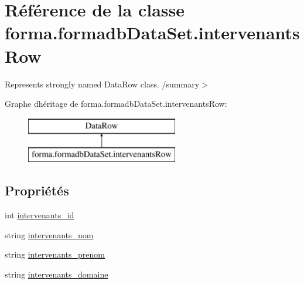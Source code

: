 \hypertarget{classforma_1_1formadb_data_set_1_1intervenants_row}{}\section{Référence de la classe forma.\+formadb\+Data\+Set.\+intervenants\+Row}
\label{classforma_1_1formadb_data_set_1_1intervenants_row}


Represents strongly named Data\+Row class. /summary$>$  


Graphe d\textquotesingle{}héritage de forma.\+formadb\+Data\+Set.\+intervenants\+Row\+:\begin{figure}[H]
\begin{center}
\leavevmode
\includegraphics[height=2.000000cm]{classforma_1_1formadb_data_set_1_1intervenants_row}
\end{center}
\end{figure}
\subsection*{Propriétés}
\begin{DoxyCompactItemize}
\item 
int \hyperlink{classforma_1_1formadb_data_set_1_1intervenants_row_a9b6da0325439fe5786829f657a0c586a}{intervenants\+\_\+id}
\item 
string \hyperlink{classforma_1_1formadb_data_set_1_1intervenants_row_a59554056d0eabe48f9cce7f8ea32a7de}{intervenants\+\_\+nom}
\item 
string \hyperlink{classforma_1_1formadb_data_set_1_1intervenants_row_aa85702e926a89873569245e92ebd3d28}{intervenants\+\_\+prenom}
\item 
string \hyperlink{classforma_1_1formadb_data_set_1_1intervenants_row_aa3a6b4e80d62891473da9dd2aa5ae6bd}{intervenants\+\_\+domaine}
\end{DoxyCompactItemize}


